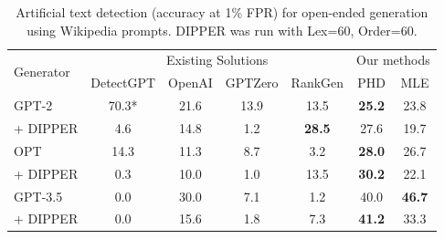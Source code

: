 \documentclass{article}
\begin{document}
\begin{table}[!t]
    \centering
    \caption{Artificial text detection (accuracy at 1\% FPR) for open-ended generation using Wikipedia prompts. DIPPER was run with Lex=60, Order=60. 
    }
    \label{tab:universal_detectors}
    \begin{tabular}{l|cccc|cc}
        \toprule
         \multirow{2}{*}{Generator} & \multicolumn{4}{c}{Existing Solutions} & \multicolumn{2}{c}{Our methods} \\
           & DetectGPT & OpenAI & GPTZero & RankGen & PHD & MLE \\
         \midrule
        GPT-2 & 70.3* & 21.6 & 13.9 & 13.5 & \bf{25.2} & 23.8 \\
        \multicolumn{1}{r|}{+ DIPPER} & 4.6 & 14.8 & 1.2 & \bf{28.5} & 27.6 & 19.7 \\
        OPT & 14.3 & 11.3 & 8.7 & 3.2 & \bf{28.0} & 26.7 \\
        \multicolumn{1}{r|}{+ DIPPER} & 0.3 & 10.0 & 1.0 & 13.5 & \bf{30.2} & 22.1 \\
        GPT-3.5 & 0.0 & 30.0 & 7.1 & 1.2 & 40.0 & \bf{46.7} \\ 
         \multicolumn{1}{r|}{+ DIPPER} & 0.0 & 15.6 & 1.8 & 7.3 & \bf{41.2} & 33.3 \\
         \bottomrule
    \end{tabular}
\end{table}
\end{document}
